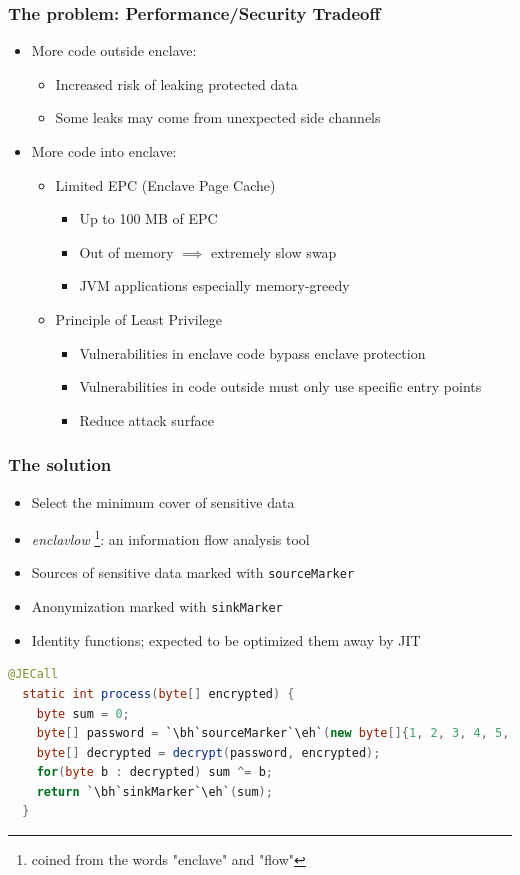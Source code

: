\documentclass{beamer}
\newcommand{\code}[1]{\colorbox{code}{\texttt{\footnotesize #1}}}
\newcounter{highlight}[page]
\newcommand{\tikzhighlightanchor}[1]{\ensuremath{\vcenter{\hbox{\tikz[remember picture, overlay]{\coordinate (#1 highlight \arabic{highlight});}}}}}
\newcommand{\bh}[0]{\stepcounter{highlight}\tikzhighlightanchor{begin}}
\newcommand{\eh}[0]{\tikzhighlightanchor{end}}
\begin{document}
\begin{frame}[t]
  \frametitle{The problem: Performance/Security Tradeoff}
  \begin{itemize}
    \item More code outside enclave:
      \begin{itemize}
        \item Increased risk of leaking protected data
        \item Some leaks may come from unexpected side channels
      \end{itemize}
    \item More code into enclave:
      \begin{itemize}
        \item Limited EPC (Enclave Page Cache)
          \begin{itemize}
            \item Up to 100 MB of EPC
            \item Out of memory $\implies$ extremely slow swap
            \item JVM applications especially memory-greedy
          \end{itemize}
        \item Principle of Least Privilege
          \begin{itemize}
            \item Vulnerabilities in enclave code bypass enclave protection
            \item Vulnerabilities in code outside must only use specific entry points
            \item Reduce attack surface
          \end{itemize}
      \end{itemize}
  \end{itemize}
\end{frame}

\begin{frame}[fragile]
  \frametitle{The solution}
  \begin{itemize}
    \item Select the minimum cover of sensitive data
    \item \textit{enclavlow} \footnote{coined from the words "enclave" and "flow"}:
      an information flow analysis tool
    \item Sources of sensitive data marked with \code{sourceMarker}
    \item Anonymization marked with \code{sinkMarker}
    \item Identity functions; expected to be optimized them away by JIT
  \end{itemize}

  \begin{lstlisting}[style=j, language=java]
  @JECall
  static int process(byte[] encrypted) {
    byte sum = 0;
    byte[] password = `\bh`sourceMarker`\eh`(new byte[]{1, 2, 3, 4, 5, 6});
    byte[] decrypted = decrypt(password, encrypted);
    for(byte b : decrypted) sum ^= b;
    return `\bh`sinkMarker`\eh`(sum);
  }
  \end{lstlisting}
\end{frame}
\end{document}
